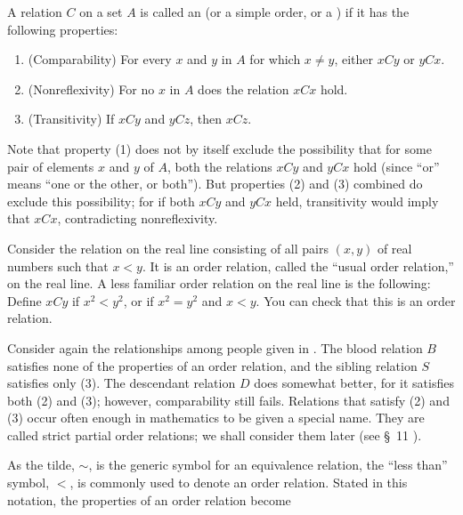 A relation \(C\) on a set \(A\) is called an  (or a simple order, or a ) if it has the following properties:

\begin{enumerate}[itemsep=0.2em, parsep=0pt, topsep=0pt, partopsep=0pt, leftmargin=*, label=(\arabic*), align=left]
\item (Comparability) For every \(x\) and \(y\) in \(A\) for which \(x \neq y\), either \({xCy}\) or \({yCx}\).

\item (Nonreflexivity) For no \(x\) in \(A\) does the relation \({xCx}\) hold.

\item (Transitivity) If \({xCy}\) and \({yCz}\), then \({xCz}\).
\end{enumerate}
Note that property (1) does not by itself exclude the possibility that for some pair of elements \(x\) and \(y\) of \(A\), both the relations \({xCy}\) and \({yCx}\) hold (since ``or'' means ``one or the other, or both''). But properties (2) and (3) combined do exclude this possibility; for if both \({xCy}\) and \({yCx}\) held, transitivity would imply that \({xCx}\), contradicting nonreflexivity.

\begin{centeredblock}
 \begin{example}
\label{ex:\thesection.\theexample}
 Consider the relation on the real line consisting of all pairs \((x, y)\) of real numbers such that \(x < y\). It is an order relation, called the ``usual order relation,'' on the real line. A less familiar order relation on the real line is the following: Define \({xCy}\) if \(x^{2} < y^{2}\), or if \(x^{2} = y^{2}\) and \(x < y\). You can check that this is an order relation.
 \end{example}
\end{centeredblock}

\begin{centeredblock}
 \begin{example}
\label{ex:\thesection.\theexample}
 Consider again the relationships among people given in . The blood relation \(B\) satisfies none of the properties of an order relation, and the sibling relation \(S\) satisfies only (3). The descendant relation \(D\) does somewhat better, for it satisfies both (2) and (3); however, comparability still fails. Relations that satisfy (2) and (3) occur often enough in mathematics to be given a special name. They are called strict partial order relations; we shall consider them later (see \S\ 11 ).
 \end{example}
\end{centeredblock}
\newpage
As the tilde, \(\sim\), is the generic symbol for an equivalence relation, the ``less than'' symbol, \(<\), is commonly used to denote an order relation. Stated in this notation, the properties of an order relation become

